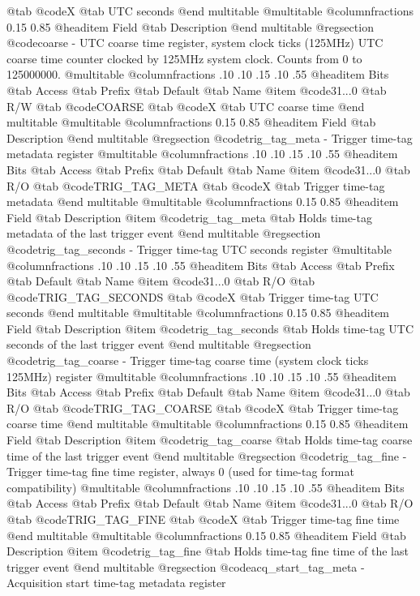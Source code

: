 @tab @code{X} @tab 
UTC seconds
@end multitable
@multitable @columnfractions 0.15 0.85
@headitem Field @tab Description
@end multitable
@regsection @code{coarse} - UTC coarse time register, system clock ticks (125MHz)
UTC coarse time counter clocked by 125MHz system clock.
Counts from 0 to 125000000.
@multitable @columnfractions .10 .10 .15 .10 .55
@headitem Bits @tab Access @tab Prefix @tab Default @tab Name
@item @code{31...0}
@tab R/W @tab
@code{COARSE}
@tab @code{X} @tab 
UTC coarse time
@end multitable
@multitable @columnfractions 0.15 0.85
@headitem Field @tab Description
@end multitable
@regsection @code{trig_tag_meta} - Trigger time-tag metadata register
@multitable @columnfractions .10 .10 .15 .10 .55
@headitem Bits @tab Access @tab Prefix @tab Default @tab Name
@item @code{31...0}
@tab R/O @tab
@code{TRIG_TAG_META}
@tab @code{X} @tab 
Trigger time-tag metadata
@end multitable
@multitable @columnfractions 0.15 0.85
@headitem Field @tab Description
@item @code{trig_tag_meta} @tab Holds time-tag metadata of the last trigger event
@end multitable
@regsection @code{trig_tag_seconds} - Trigger time-tag UTC seconds register
@multitable @columnfractions .10 .10 .15 .10 .55
@headitem Bits @tab Access @tab Prefix @tab Default @tab Name
@item @code{31...0}
@tab R/O @tab
@code{TRIG_TAG_SECONDS}
@tab @code{X} @tab 
Trigger time-tag UTC seconds
@end multitable
@multitable @columnfractions 0.15 0.85
@headitem Field @tab Description
@item @code{trig_tag_seconds} @tab Holds time-tag UTC seconds of the last trigger event
@end multitable
@regsection @code{trig_tag_coarse} - Trigger time-tag coarse time (system clock ticks 125MHz) register
@multitable @columnfractions .10 .10 .15 .10 .55
@headitem Bits @tab Access @tab Prefix @tab Default @tab Name
@item @code{31...0}
@tab R/O @tab
@code{TRIG_TAG_COARSE}
@tab @code{X} @tab 
Trigger time-tag coarse time
@end multitable
@multitable @columnfractions 0.15 0.85
@headitem Field @tab Description
@item @code{trig_tag_coarse} @tab Holds time-tag coarse time of the last trigger event
@end multitable
@regsection @code{trig_tag_fine} - Trigger time-tag fine time register, always 0 (used for time-tag format compatibility)
@multitable @columnfractions .10 .10 .15 .10 .55
@headitem Bits @tab Access @tab Prefix @tab Default @tab Name
@item @code{31...0}
@tab R/O @tab
@code{TRIG_TAG_FINE}
@tab @code{X} @tab 
Trigger time-tag fine time
@end multitable
@multitable @columnfractions 0.15 0.85
@headitem Field @tab Description
@item @code{trig_tag_fine} @tab Holds time-tag fine time of the last trigger event
@end multitable
@regsection @code{acq_start_tag_meta} - Acquisition start time-tag metadata register
